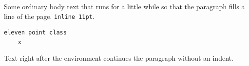 \documentclass[11pt]{article}
\begin{document}
Some ordinary body text that runs for a little while so that the paragraph fills a line of the page. \verb|inline 11pt|.
\begin{verbatim}
eleven point class
	x
\end{verbatim}
Text right after the environment continues the paragraph without an indent.
\end{document}
